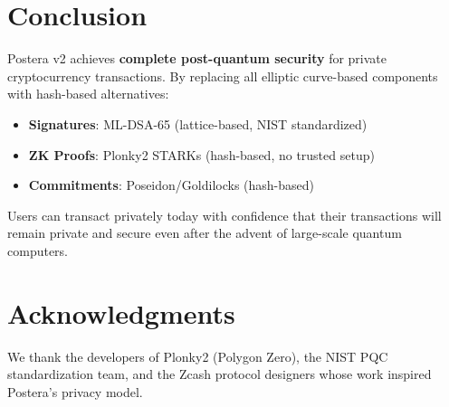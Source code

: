\documentclass[11pt,a4paper]{article}
\begin{document}
\section{Conclusion}

Postera v2 achieves \textbf{complete post-quantum security} for private cryptocurrency transactions. By replacing all elliptic curve-based components with hash-based alternatives:

\begin{itemize}
    \item \textbf{Signatures}: ML-DSA-65 (lattice-based, NIST standardized)
    \item \textbf{ZK Proofs}: Plonky2 STARKs (hash-based, no trusted setup)
    \item \textbf{Commitments}: Poseidon/Goldilocks (hash-based)
\end{itemize}

Users can transact privately today with confidence that their transactions will remain private and secure even after the advent of large-scale quantum computers.

\section*{Acknowledgments}

We thank the developers of Plonky2 (Polygon Zero), the NIST PQC standardization team, and the Zcash protocol designers whose work inspired Postera's privacy model.
\end{document}
